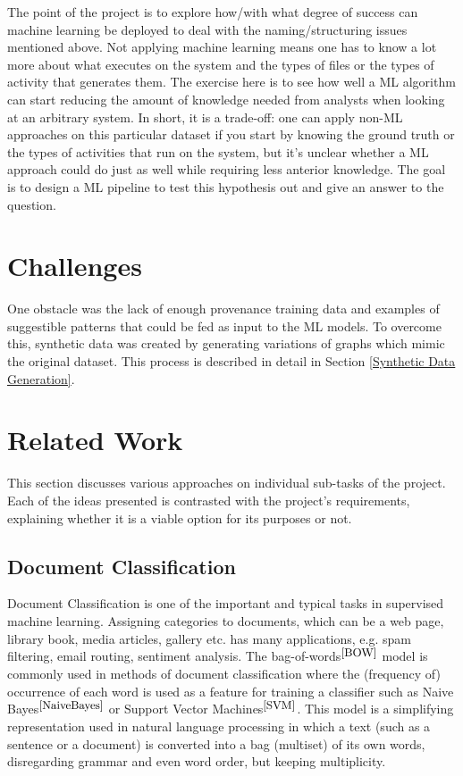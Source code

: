 The point of the project is to explore how/with what degree of success can machine learning be deployed to deal with the naming/structuring issues mentioned above. Not applying machine learning means one has to know a lot more about what executes on the system and the types of files or the types of activity that generates them. The exercise here is to see how well a ML algorithm can start reducing the amount of knowledge needed from analysts when looking at an arbitrary system. In short, it is a trade-off: one can apply non-ML approaches on this particular dataset if you start by knowing the ground truth or the types of activities that run on the system, but it's unclear whether a ML approach could do just as well while requiring less anterior knowledge. The goal is to design a ML pipeline to test this hypothesis out and give an answer to the question. \\

\section{Challenges}

One obstacle was the lack of enough provenance training data and examples of suggestible patterns that could be fed as input to the ML models. To overcome this, synthetic data was created by generating variations of graphs which mimic the original dataset. This process is described in detail in Section \ref{Synthetic Data Generation}.

\section{Related Work}

This section discusses various approaches on individual sub-tasks of the project. Each of the ideas presented is contrasted with the project's requirements, explaining whether it is a viable option for its purposes or not. \\

\subsection{Document Classification}

Document Classification is one of the important and typical tasks in supervised machine learning. Assigning categories to documents, which can be a web page, library book, media articles, gallery etc. has many applications, e.g. spam filtering, email routing, sentiment analysis. The bag-of-words$^{\small \cite{BOW}}$ model is commonly used in methods of document classification where the (frequency of) occurrence of each word is used as a feature for training a classifier such as Naive Bayes$^{\small \cite{NaiveBayes}}$ or Support Vector Machines$^{\small \cite{SVM}}$. This model is a simplifying representation used in natural language processing in which a text (such as a sentence or a document) is converted into a bag (multiset) of its own words, disregarding grammar and even word order, but keeping multiplicity. \\

